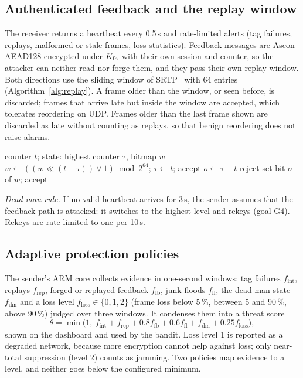 \subsection{Authenticated feedback and the replay window}\label{sec:feedback}
The receiver returns a heartbeat every 0.5\,s and rate-limited alerts (tag failures, replays, malformed or stale frames, loss statistics). Feedback messages are Ascon-AEAD128 encrypted under $K_{\mathrm{fb}}$ with their own session and counter, so the attacker can neither read nor forge them, and they pass their own replay window. Both directions use the sliding window of SRTP~\cite{rfc3711} with 64 entries (Algorithm~\ref{alg:replay}). A frame older than the window, or seen before, is discarded; frames that arrive late but inside the window are accepted, which tolerates reordering on UDP. Frames older than the last frame shown are discarded as late without counting as replays, so that benign reordering does not raise alarms.

\begin{algorithm}[t]
\caption{Replay window (64 entries, after RFC~3711)}
\label{alg:replay}
\begin{algorithmic}[1]
\Require counter $t$; state: highest counter $\tau$, bitmap $w$
  \State $w \gets ((w \ll (t - \tau)) \lor 1) \bmod 2^{64}$; $\tau \gets t$; \Return accept
\EndIf
\State $o \gets \tau - t$
 \Return reject \EndIf
\State set bit $o$ of $w$; \Return accept
\end{algorithmic}
\end{algorithm}

\textit{Dead-man rule.} If no valid heartbeat arrives for 3\,s, the sender assumes that the feedback path is attacked: it switches to the highest level and rekeys (goal G4). Rekeys are rate-limited to one per 10\,s.

\subsection{Adaptive protection policies}\label{sec:policy}
The sender's ARM core collects evidence in one-second windows: tag failures $f_{\mathrm{int}}$, replays $f_{\mathrm{rep}}$, forged or replayed feedback $f_{\mathrm{fb}}$, junk floods $f_{\mathrm{fl}}$, the dead-man state $f_{\mathrm{dm}}$ and a loss level $f_{\mathrm{loss}} \in \{0, 1, 2\}$ (frame loss below 5\,\%, between 5 and 90\,\%, above 90\,\%) judged over three windows. It condenses them into a threat score
\begin{equation}
\theta = \min\bigl(1,\ f_{\mathrm{int}} + f_{\mathrm{rep}} + 0.8 f_{\mathrm{fb}} + 0.6 f_{\mathrm{fl}} + f_{\mathrm{dm}} + 0.25 f_{\mathrm{loss}}\bigr),
\label{eq:threat}
\end{equation}
shown on the dashboard and used by the bandit. Loss level 1 is reported as a degraded network, because more encryption cannot help against loss; only near-total suppression (level 2) counts as jamming. Two policies map evidence to a level, and neither goes below the configured minimum.

